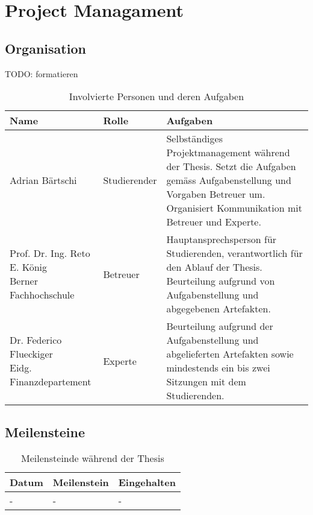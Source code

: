 \chapter{Project Managament}
\label{chap:projectmanagement}

\section{Organisation}
TODO: formatieren

\begin{table}[h!]
\begin{tabularx}{\textwidth}{|l|l|X|}

 \hline
 {\bf Name } & {\bf Rolle } & {\bf Aufgaben} \\ 
 \hline
 Adrian Bärtschi                &   Studierender   &     
 Selbständiges Projektmanagement während der Thesis. Setzt die Aufgaben gemäss Aufgabenstellung und Vorgaben Betreuer um. Organisiert Kommunikation mit Betreuer und Experte.   \\
 \hline
  \parbox[t]{5cm}{Prof. Dr. Ing. Reto E. König \\ Berner Fachhochschule}  &   Betreuer  &
  Hauptansprechsperson für Studierenden, verantwortlich für den Ablauf der Thesis. Beurteilung aufgrund von Aufgabenstellung und abgegebenen Artefakten.   \\
 \hline
  \parbox[t]{5cm}{Dr. Federico Flueckiger \\ Eidg.  Finanzdepartement} &   Experte     &
  Beurteilung aufgrund der Aufgabenstellung und abgelieferten Artefakten sowie mindestends ein bis zwei Sitzungen mit dem Studierenden. \\ 
\hline

\end{tabularx}
\caption{Involvierte Personen und deren Aufgaben}
\end{table}



\section{Meilensteine}

\begin{table}[h!]
\begin{tabularx}{\textwidth}{|l|l|X|}

 \hline
 {\bf Datum } & {\bf Meilenstein } & {\bf Eingehalten } \\ 
 \hline
 -                &   -   &     -   \\
 \hline
 
\end{tabularx}
\caption{Meilensteinde während der Thesis}
\end{table}


